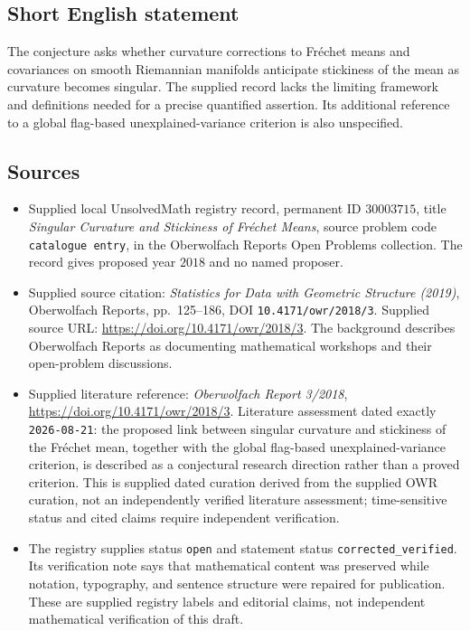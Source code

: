 \documentclass[11pt]{article}
\begin{document}
\subsection{Short English statement}
The conjecture asks whether curvature corrections to Fr\'{e}chet means and covariances on smooth Riemannian manifolds anticipate stickiness of the mean as curvature becomes singular. The supplied record lacks the limiting framework and definitions needed for a precise quantified assertion. Its additional reference to a global flag-based unexplained-variance criterion is also unspecified.
\subsection{Sources}
\begin{itemize}
\item Supplied local UnsolvedMath registry record, permanent ID \(30003715\), title \emph{Singular Curvature and Stickiness of Fr\'{e}chet Means}, source problem code \texttt{catalogue entry}, in the Oberwolfach Reports Open Problems collection. The record gives proposed year \(2018\) and no named proposer.
\item Supplied source citation: \emph{Statistics for Data with Geometric Structure (2019)}, Oberwolfach Reports, pp.~125--186, DOI \texttt{10.4171/owr/2018/3}. Supplied source URL: \url{https://doi.org/10.4171/owr/2018/3}. The background describes Oberwolfach Reports as documenting mathematical workshops and their open-problem discussions.
\item Supplied literature reference: \emph{Oberwolfach Report 3/2018}, \url{https://doi.org/10.4171/owr/2018/3}. Literature assessment dated exactly \texttt{2026-08-21}: the proposed link between singular curvature and stickiness of the Fr\'{e}chet mean, together with the global flag-based unexplained-variance criterion, is described as a conjectural research direction rather than a proved criterion. This is supplied dated curation derived from the supplied OWR curation, not an independently verified literature assessment; time-sensitive status and cited claims require independent verification.
\item The registry supplies status \texttt{open} and statement status \texttt{corrected\_verified}. Its verification note says that mathematical content was preserved while notation, typography, and sentence structure were repaired for publication. These are supplied registry labels and editorial claims, not independent mathematical verification of this draft.
\end{itemize}
\end{document}
